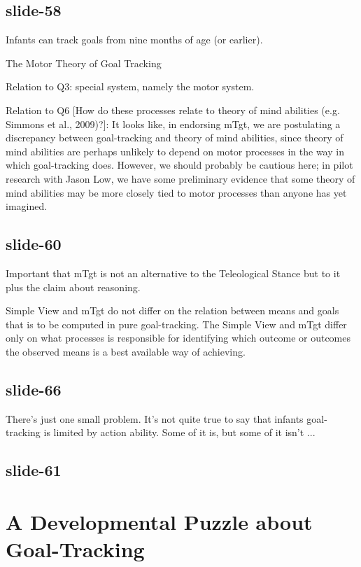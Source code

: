 \documentclass[12pt,\papersize]{extarticle}
\begin{document}
\subsection{slide-58}
Infants can track goals from nine months of age (or earlier).
 
The Motor Theory of Goal Tracking
 
Relation to Q3: special system, namely the motor system.
 
Relation to Q6 [How do these processes relate to theory of mind abilities (e.g. Simmons et al.,
2009)?]:
It looks like, in endorsing mTgt, we are postulating a discrepancy between goal-tracking and
theory of mind abilities, since theory of mind abilities are perhaps unlikely to depend on motor
processes in the way in which goal-tracking does. 
However, we should probably be cautious here; in pilot research with Jason Low, we have some
preliminary evidence that some theory of mind abilities may be more closely tied to motor processes
than anyone has yet imagined.
 
\subsection{slide-60}
Important that 
mTgt is not an alternative to the Teleological Stance but to it plus the claim about reasoning.
 
Simple View and mTgt do not differ on the relation between means and goals that is to be 
computed in pure goal-tracking.
The Simple View and mTgt differ only on what processes is responsible for identifying which outcome or
outcomes the observed means is a best available way of achieving.
 
\subsection{slide-66}
There’s just one small problem. It’s not quite true to say that 
infants goal-tracking is limited by action ability.
Some of it is, but some of it isn’t ...
 
\subsection{slide-61}
 
 
\section{A Developmental Puzzle about Goal-Tracking}
 
\end{document}
